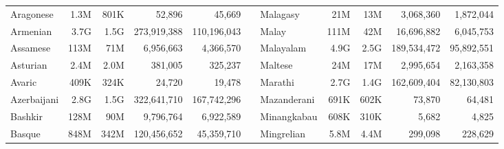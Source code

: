 \begin{table*}[t!]
\begin{tabular}{lrrrrclrrrr}
        Aragonese                 & 1.3M                     & 801K                      & 52,896                   & 45,669                    &                          & Malagasy                  & 21M                      & 13M                       & 3,068,360                & 1,872,044                 \\
        Armenian                  & 3.7G                     & 1.5G                      & 273,919,388              & 110,196,043               &                          & Malay                     & 111M                     & 42M                       & 16,696,882               & 6,045,753                 \\
        Assamese                  & 113M                     & 71M                       & 6,956,663                & 4,366,570                 &                          & Malayalam                 & 4.9G                     & 2.5G                      & 189,534,472              & 95,892,551                \\
        Asturian                  & 2.4M                     & 2.0M                      & 381,005                  & 325,237                   &                          & Maltese                   & 24M                      & 17M                       & 2,995,654                & 2,163,358                 \\
        Avaric                    & 409K                     & 324K                      & 24,720                   & 19,478                    &                          & Marathi                   & 2.7G                     & 1.4G                      & 162,609,404              & 82,130,803                \\
        Azerbaijani               & 2.8G                     & 1.5G                      & 322,641,710              & 167,742,296               &                          & Mazanderani               & 691K                     & 602K                      & 73,870                   & 64,481                    \\
        Bashkir                   & 128M                     & 90M                       & 9,796,764                & 6,922,589                 &                          & Minangkabau               & 608K                     & 310K                      & 5,682                    & 4,825                     \\
        Basque                    & 848M                     & 342M                      & 120,456,652              & 45,359,710                &                          & Mingrelian                & 5.8M                     & 4.4M                      & 299,098                  & 228,629                   \\

\end{tabular}
\end{table*}
